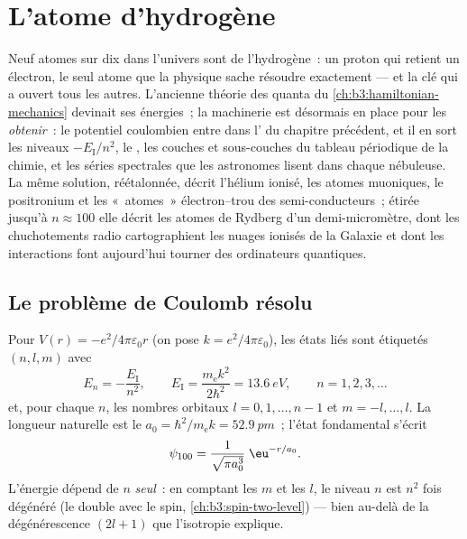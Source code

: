 \chapter{L'atome d'hydrogène}\label{ch:b3:hydrogen-atom}

Neuf atomes sur dix dans l'univers sont de l'hydrogène~: un proton qui
retient un électron, le seul atome que la physique sache résoudre
exactement --- et la clé qui a ouvert tous les autres. L'ancienne
théorie des quanta du \cref{ch:b3:hamiltonian-mechanics} devinait ses
énergies~; la machinerie est désormais en place pour les
\emph{obtenir}~: le potentiel coulombien entre dans l'
du chapitre précédent, et il en sort les niveaux $-E_{\text{I}}/n^2$,
le , les couches et sous-couches du tableau périodique de
la chimie, et les séries spectrales que les astronomes lisent dans
chaque nébuleuse. La même solution, réétalonnée, décrit l'hélium
ionisé, les atomes muoniques, le positronium et les «~atomes~»
électron--trou des semi-conducteurs~; étirée jusqu'à $n
\approx 100$ elle décrit les atomes de Rydberg d'un demi-micromètre,
dont les chuchotements radio cartographient les nuages ionisés de la
Galaxie et dont les interactions font aujourd'hui tourner des
ordinateurs quantiques.

\section{Le problème de Coulomb résolu}

\begin{theorem}\label{thm:b3:hydrogen-atom:levels}
Pour $V(r) = -e^2/4\pi\varepsilon_0 r$ (on pose $k = e^2/4\pi
\varepsilon_0$), les états liés sont étiquetés $(n, l, m)$ avec
\[
E_n = -\frac{E_{\text{I}}}{n^2} , \qquad
E_{\text{I}} = \frac{m_{\text{e}}k^2}{2\hbar^2} = \qty{13.6}{eV} ,
\qquad n = 1, 2, 3, \dots
\]
et, pour chaque $n$, les nombres orbitaux $l = 0, 1, \dots, n-1$ et
$m = -l, \dots, l$. La longueur naturelle est le  $a_0 =
\hbar^2/m_{\text{e}}k = \qty{52.9}{pm}$~; l'état fondamental s'écrit
\[
\psi_{100} = \frac{1}{\sqrt{\pi a_0^3}}\;\eu^{-r/a_0} .
\]
L'énergie dépend de $n$ \emph{seul}~: en comptant les $m$ et les $l$,
le niveau $n$ est $n^2$ fois dégénéré (le double avec le spin,
\cref{ch:b3:spin-two-level}) --- bien au-delà de la dégénérescence
$(2l+1)$ que l'isotropie explique.
\end{theorem}

